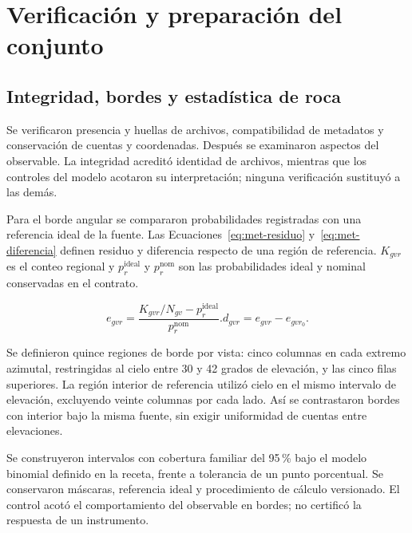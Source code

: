 \section{Verificación y preparación del conjunto}\label{sec:met-datos}
\subsection{Integridad, bordes y estadística de roca}
Se verificaron presencia y huellas de archivos, compatibilidad de metadatos y conservación de cuentas y coordenadas. Después se examinaron aspectos del observable. La integridad acreditó identidad de archivos, mientras que los controles del modelo acotaron su interpretación; ninguna verificación sustituyó a las demás.

Para el borde angular se compararon probabilidades registradas con una referencia ideal de la fuente. Las Ecuaciones~\eqref{eq:met-residuo} y~\eqref{eq:met-diferencia} definen residuo y diferencia respecto de una región de referencia. $K_{gvr}$ es el conteo regional y $p_r^{\mathrm{ideal}}$ y $p_r^{\mathrm{nom}}$ son las probabilidades ideal y nominal conservadas en el contrato.
\begin{samepage}
\begin{subequations}
\begin{equation}e_{gvr}=\frac{K_{gvr}/N_{gv}-p_r^{\mathrm{ideal}}}{p_r^{\mathrm{nom}}}.\label{eq:met-residuo}\end{equation}
\begin{equation}d_{gvr}=e_{gvr}-e_{gvr_0}.\label{eq:met-diferencia}\end{equation}
\end{subequations}
\end{samepage}
Se definieron quince regiones de borde por vista: cinco columnas en cada extremo azimutal, restringidas al cielo entre 30 y 42 grados de elevación, y las cinco filas superiores. La región interior de referencia utilizó cielo en el mismo intervalo de elevación, excluyendo veinte columnas por cada lado. Así se contrastaron bordes con interior bajo la misma fuente, sin exigir uniformidad de cuentas entre elevaciones.

Se construyeron intervalos con cobertura familiar del 95\,\% bajo el modelo binomial definido en la receta, frente a tolerancia de un punto porcentual. Se conservaron máscaras, referencia ideal y procedimiento de cálculo versionado. El control acotó el comportamiento del observable en bordes; no certificó la respuesta de un instrumento.

